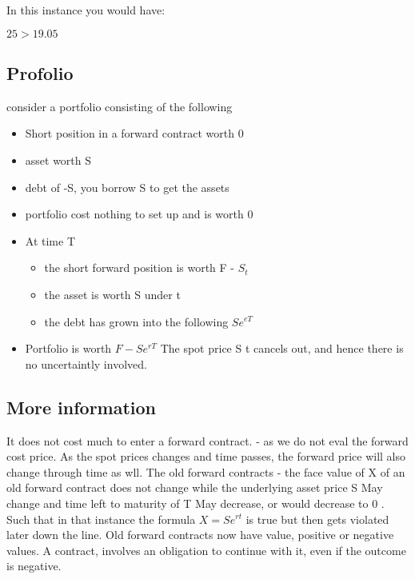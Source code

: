 \documentclass{article}
\theoremstyle{mytheoremstyle}
\theoremstyle{mytheoremstyle}
\theoremstyle{myproblemstyle}
\begin{document}
In this instance you would have:

\begin{math}
	25 > 19.05
\end{math}
\subsection{Profolio}
consider a portfolio consisting of the following
\begin{itemize}
	\item Short position in a forward contract worth 0
	\item asset worth S
	\item debt of -S, you borrow S to get the assets
	\item portfolio cost nothing to set up and is worth 0
	\item At time T
	      \begin{itemize}
		      \item the short forward position is worth F - $S_t$
		      \item the asset is worth S under t
		      \item the debt has grown into the following $Se^{eT}$
	      \end{itemize}
	\item Portfolio is worth $F - Se^{rT}$
	      The spot price S t cancels out, and hence there is no uncertaintly involved.
\end{itemize}


\subsection{More information}
It does not cost much to enter a forward contract. - as we do not eval the forward cost price.
As the spot prices changes and time passes, the forward price will also change through time as wll.
The old forward contracts - the face value of X of an old forward contract does not change while the underlying asset price S May change and time left to maturity of T May decrease, or would decrease to 0 .
Such that in that instance the formula $X = Se^{rt}$ is true but then gets violated later down the line.
Old forward contracts now have value, positive or negative values. A contract, involves an obligation to continue with it, even if the outcome is negative.
\end{document}

